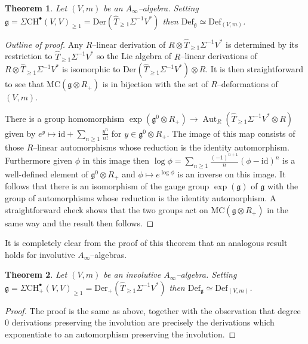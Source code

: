 \documentclass[british]{amsart}
\theoremstyle{plain}
\newtheorem{theorem}{Theorem}[section]
\theoremstyle{definition}
{
\newaliascnt{{definition}}{theorem}\newtheorem{{definition}}[{definition}]{{Definition}}\aliascntresetthe{{definition}}\expandafterautorefname\endcsname{{Definition}}}
{
\newaliascnt{{remark}}{theorem}\newtheorem{{remark}}[{remark}]{{Remark}}\aliascntresetthe{{remark}}\expandafterautorefname\endcsname{{Remark}}}
{
\newaliascnt{{example}}{theorem}\newtheorem{{example}}[{example}]{{Example}}\aliascntresetthe{{example}}\expandafterautorefname\endcsname{{Example}}}
{
\newaliascnt{{examples}}{theorem}\newtheorem{{examples}}[{examples}]{{Examples}}\aliascntresetthe{{examples}}\expandafterautorefname\endcsname{{Examples}}}
{
\newaliascnt{{notation}}{theorem}\newtheorem{{notation}}[{notation}]{{Notation}}\aliascntresetthe{{notation}}\expandafterautorefname\endcsname{{Notation}}}
{
\newaliascnt{{convention}}{theorem}\newtheorem{{convention}}[{convention}]{{Convention}}\aliascntresetthe{{convention}}\expandafterautorefname\endcsname{{Convention}}}
\numberwithin{equation}{section}
\numberwithin{figure}{section}
\begin{document}
\begin{theorem}
Let $(V,m)$ be an $A_\infty$--algebra. Setting $\mathfrak{g}=\Sigma{\mathrm{CH}}^\bullet(V,V)_{\geq 1}={\mathrm{Der}}(\widehat{T}_{\geq 1}\Sigma^{-1}V^*)$ then ${\mathrm{Def}}_{\mathfrak{g}}\simeq {\mathrm{Def}}_{(V,m)}$.
\end{theorem}

\begin{proof}[Outline of proof]
Any $R$--linear derivation of $R\otimes \widehat{T}_{\geq 1}\Sigma^{-1}V^*$ is determined by its restriction to $\widehat{T}_{\geq 1}\Sigma^{-1}V^*$ so the Lie algebra of $R$--linear derivations of $R\otimes \widehat{T}_{\geq 1}\Sigma^{-1}V^*$ is isomorphic to ${\mathrm{Der}}(\widehat{T}_{\geq 1}\Sigma^{-1}V^*)\otimes R$. It is then straightforward to see that ${\mathrm{MC}}(\mathfrak{g}\otimes R_+)$ is in bijection with the set of $R$--deformations of $(V,m)$.

There is a group homomorphism $\exp(\mathfrak{g}^0\otimes R_+)\rightarrow \operatorname{Aut}_R(\widehat{T}_{\geq 1}\Sigma^{-1}V^*\otimes R)$ given by $e^y\mapsto {\mathrm{id}} + \sum_{n\geq 1} \frac{y^n}{n!}$ for $y\in\mathfrak{g}^0\otimes R_+$. The image of this map consists of those $R$--linear automorphisms whose reduction is the identity automorphism. Furthermore given $\phi$ in this image then $\log \phi = \sum_{n\geq 1} \frac{(-1)^{n+1}}{n}(\phi-{\mathrm{id}})^n$ is a well-defined element of $\mathfrak{g}^0\otimes R_+$ and $\phi\mapsto e^{\log \phi}$ is an inverse on this image. It follows that there is an isomorphism of the gauge group $\exp(\mathfrak{g})$ of $\mathfrak{g}$ with the group of automorphisms whose reduction is the identity automorphism. A straightforward check shows that the two groups act on ${\mathrm{MC}}(\mathfrak{g}\otimes R_+)$ in the same way and the result then follows.
\end{proof}

It is completely clear from the proof of this theorem that an analogous result holds for involutive $A_\infty$--algebras. 

\begin{theorem}
Let $(V,m)$ be an involutive $A_\infty$--algebra. Setting $\mathfrak{g}=\Sigma{\mathrm{CH}}^\bullet_+(V,V)_{\geq 1} = {\mathrm{Der}}_+(\widehat{T}_{\geq 1}\Sigma^{-1}V^*)$ then ${\mathrm{Def}}_{\mathfrak{g}} \simeq {\mathrm{Def}}_{(V,m)}$.
\end{theorem}

\begin{proof}
The proof is the same as above, together with the observation that degree $0$ derivations preserving the involution are precisely the derivations which exponentiate to an automorphism preserving the involution.
\end{proof}
\end{document}
